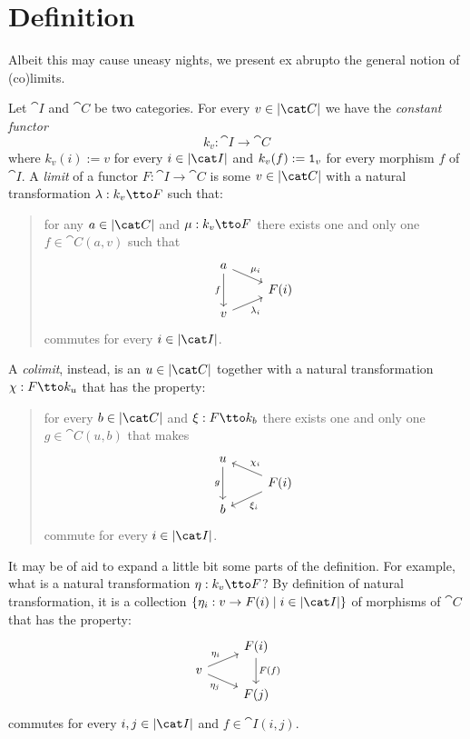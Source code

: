 
\section{Definition}

Albeit this may cause uneasy nights, we present ex abrupto the general notion of (co)limits.

\begin{definition}
Let \(\cat I\) and \(\cat C\) be two categories. For every \(v \in \obj{\cat C}\) we have the {\em constant functor}
\[k_v : \cat I \to \cat C\]
where \(k_v(i) := v\) for every \(i \in \obj{\cat I}\) and \(k_v(f) := \mathtt 1_v\) for every morphism \(f\) of \(\cat I\). A {\em limit} of a functor \(F : \cat I \to \cat C\) is some \(v \in \obj{\cat C}\) with a natural transformation \(\lambda : k_v \tto F\)
such that:
\begin{quotation}
for any \(a \in \obj{\cat C}\) and \(\mu : k_v \tto F\)
there exists one and only one \(f \in \cat C(a, v)\) such that
\[\begin{tikzcd}[row sep=tiny]
a \ar["{\mu_i}", dr] \ar["f", dd, swap] \\
& F(i) \\
v \ar["{\lambda_i}", ur, swap]
\end{tikzcd}\]
commutes for every \(i \in \obj{\cat I}\).
\end{quotation}
A {\em colimit}, instead, is an \(u \in \obj{\cat C}\) together with a natural transformation \(\chi : F \tto k_u\) that has the property:
\begin{quotation}
for every \(b \in \obj{\cat C}\) and \(\xi : F \tto k_b\) there exists one and only one \(g \in \cat C(u, b)\) that makes
\[\begin{tikzcd}[row sep=tiny]
u  \ar["g", dd, swap] \\
& F(i) \ar["{\chi_i}", ul, swap] \ar["{\xi_i}", dl]\\
b
\end{tikzcd}\]
commute for every \(i \in \obj{\cat I}\).
\end{quotation}
\end{definition}

It may be of aid to expand a little bit some parts of the definition. For example, what is a natural transformation \(\eta : k_v \tto F\)? By definition of natural transformation, it is a collection \(\set{\eta_i : v \to F(i) \mid i \in \obj{\cat I}}\) of morphisms of \(\cat C\) that has the property:
\[\begin{tikzcd}[row sep=tiny]
& F(i) \ar["{F(f)}", dd] \\
v \ar["{\eta_i}", ur] \ar["{\eta_j}", dr, swap] \\
& F(j)
\end{tikzcd}\]
commutes for every \(i, j \in \obj{\cat I}\) and \(f \in \cat I (i, j)\).

